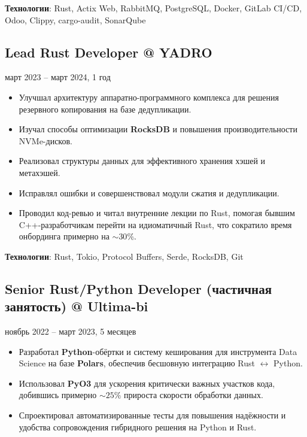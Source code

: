 \documentclass[a4paper,12pt]{article}
\begin{document}
\textbf{Технологии}: Rust, Actix Web, RabbitMQ, PostgreSQL, Docker, GitLab CI/CD, Odoo, Clippy, cargo-audit, SonarQube

\vspace{3mm}

\subsection*{Lead Rust Developer @ YADRO}
\quad март 2023 – март 2024, 1 год
\begin{itemize}[leftmargin=15pt]
    \item Улучшал архитектуру аппаратно-программного комплекса для решения резервного копирования на базе дедупликации.
    \item Изучал способы оптимизации \textbf{RocksDB} и повышения производительности NVMe-дисков.
    \item Реализовал структуры данных для эффективного хранения хэшей и метахэшей.
    \item Исправлял ошибки и совершенствовал модули сжатия и дедупликации.
    \item Проводил код-ревью и читал внутренние лекции по Rust, помогая бывшим C++-разработчикам перейти на идиоматичный Rust, что сократило время онбординга примерно на \(\sim 30\%\).
\end{itemize}

\textbf{Технологии}: Rust, Tokio, Protocol Buffers, Serde, RocksDB, Git

\vspace{3mm}

\subsection*{Senior Rust/Python Developer (частичная занятость) @ Ultima-bi}
\quad ноябрь 2022 – март 2023, 5 месяцев
\begin{itemize}[leftmargin=15pt]
    \item Разработал \textbf{Python}-обёртки и систему кеширования для инструмента Data Science на базе \textbf{Polars}, обеспечив бесшовную интеграцию Rust \(\leftrightarrow\) Python.
    \item Использовал \textbf{PyO3} для ускорения критически важных участков кода, добившись примерно \(\sim 25\%\) прироста скорости обработки данных.
    \item Спроектировал автоматизированные тесты для повышения надёжности и удобства сопровождения гибридного решения на Python и Rust.
\end{itemize}
\end{document}
